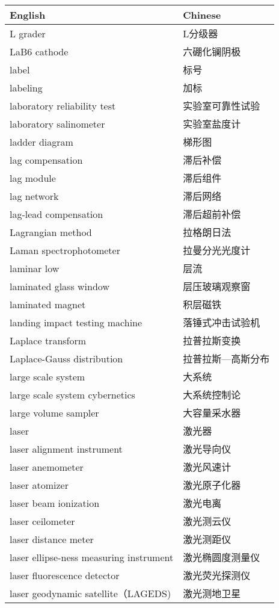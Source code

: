 \documentclass[
]{article}
\begin{document}
\begin{longtable}[]{@{}ll@{}}
\toprule()
English & Chinese \\
\midrule()
\endhead
L grader & L分级器 \\
LaB6 cathode & 六硼化镧阴极 \\
label & 标号 \\
labeling & 加标 \\
laboratory reliability test & 实验室可靠性试验 \\
laboratory salinometer & 实验室盐度计 \\
ladder diagram & 梯形图 \\
lag compensation & 滞后补偿 \\
lag module & 滞后组件 \\
lag network & 滞后网络 \\
lag-lead compensation & 滞后超前补偿 \\
Lagrangian method & 拉格朗日法 \\
Laman spectrophotometer & 拉曼分光光度计 \\
laminar low & 层流 \\
laminated glass window & 层压玻璃观察窗 \\
laminated magnet & 积层磁铁 \\
landing impact testing machine & 落锤式冲击试验机 \\
Laplace transform & 拉普拉斯变换 \\
Laplace-Gauss distribution & 拉普拉斯---高斯分布 \\
large scale system & 大系统 \\
large scale system cybernetics & 大系统控制论 \\
large volume sampler & 大容量采水器 \\
laser & 激光器 \\
laser alignment instrument & 激光导向仪 \\
laser anemometer & 激光风速计 \\
laser atomizer & 激光原子化器 \\
laser beam ionization & 激光电离 \\
laser ceilometer & 激光测云仪 \\
laser distance meter & 激光测距仪 \\
laser ellipse-ness measuring instrument & 激光椭圆度测量仪 \\
laser fluorescence detector & 激光荧光探测仪 \\
laser geodynamic satellite（LAGEDS) & 激光测地卫星 \\

\end{longtable}
\end{document}

